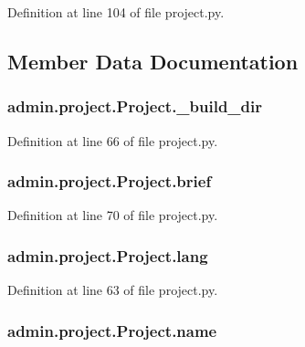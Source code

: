 Definition at line 104 of file project.\-py.



\subsection{Member Data Documentation}
\hypertarget{classadmin_1_1project_1_1Project_a9357a34aaccfd3fc391b4081f6794ee8}{
\subsubsection[{\-\_\-build\-\_\-dir}]{\setlength{\rightskip}{0pt plus 5cm}admin.\-project.\-Project.\-\_\-build\-\_\-dir\hspace{0.3cm}{\ttfamily [private]}}}\label{classadmin_1_1project_1_1Project_a9357a34aaccfd3fc391b4081f6794ee8}


Definition at line 66 of file project.\-py.

\hypertarget{classadmin_1_1project_1_1Project_ac3e2b73e80631fe2171b8d4b236f2e53}{
\subsubsection[{brief}]{\setlength{\rightskip}{0pt plus 5cm}admin.\-project.\-Project.\-brief}}\label{classadmin_1_1project_1_1Project_ac3e2b73e80631fe2171b8d4b236f2e53}


Definition at line 70 of file project.\-py.

\hypertarget{classadmin_1_1project_1_1Project_add0eb047a815df47b9b888aa8a028b77}{
\subsubsection[{lang}]{\setlength{\rightskip}{0pt plus 5cm}admin.\-project.\-Project.\-lang}}\label{classadmin_1_1project_1_1Project_add0eb047a815df47b9b888aa8a028b77}


Definition at line 63 of file project.\-py.

\hypertarget{classadmin_1_1project_1_1Project_a9b8c34b91f1ecdbbdcfea42e771dd6d6}{
\subsubsection[{name}]{\setlength{\rightskip}{0pt plus 5cm}admin.\-project.\-Project.\-name}}\label{classadmin_1_1project_1_1Project_a9b8c34b91f1ecdbbdcfea42e771dd6d6}


